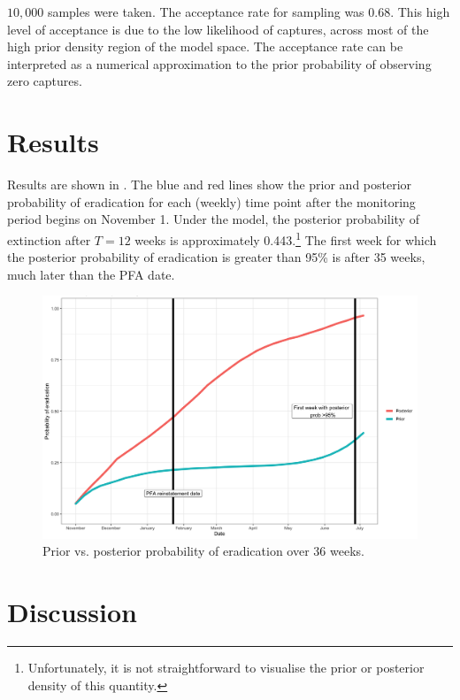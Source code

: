 \documentclass[
  oneside]{book}
\begin{document}
\(10{,}000\) samples were taken. The acceptance rate for sampling was 0.68. This high level of acceptance is due to the low likelihood of captures, across most of the high prior density region of the model space. The acceptance rate can be interpreted as a numerical approximation to the prior probability of observing zero captures.

\hypertarget{results}{%
\section{Results}\label{results}}

Results are shown in \citet{postfig}. The blue and red lines show the prior and posterior probability of eradication for each (weekly) time point after the monitoring period begins on November 1. Under the model, the posterior probability of extinction after \(T=12\) weeks is approximately 0.443.\footnote{Unfortunately, it is not straightforward to visualise the prior or posterior density of this quantity.} The first week for which the posterior probability of eradication is greater than 95\% is after 35 weeks, much later than the PFA date.

\begin{figure}

{\centering \includegraphics[width=1\linewidth]{results/pfa_criteria_evaluation/prior_vs_post_plot} 

}

\caption{Prior vs. posterior probability of eradication over 36 weeks.}\label{fig:postfig}
\end{figure}

\hypertarget{discussion}{%
\section{Discussion}\label{discussion}}
\end{document}
